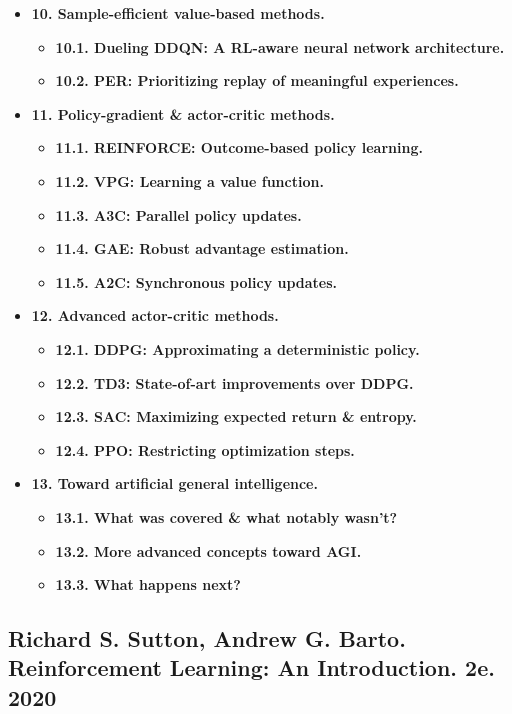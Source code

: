 \documentclass{article}
\begin{document}
\begin{itemize}
    \item {\bf10. Sample-efficient value-based methods.}
    \begin{itemize}
        \item {\bf10.1. Dueling DDQN: A RL-aware neural network architecture.}
        \item {\bf10.2. PER: Prioritizing replay of meaningful experiences.}
    \end{itemize}
    \item {\bf11. Policy-gradient \& actor-critic methods.}
    \begin{itemize}
        \item {\bf11.1. REINFORCE: Outcome-based policy learning.}
        \item {\bf11.2. VPG: Learning a value function.}
        \item {\bf11.3. A3C: Parallel policy updates.}
        \item {\bf11.4. GAE: Robust advantage estimation.}
        \item {\bf11.5. A2C: Synchronous policy updates.}
    \end{itemize}
    \item {\bf12. Advanced actor-critic methods.}
    \begin{itemize}
        \item {\bf12.1. DDPG: Approximating a deterministic policy.}
        \item {\bf12.2. TD3: State-of-art improvements over DDPG.}
        \item {\bf12.3. SAC: Maximizing expected return \& entropy.}
        \item {\bf12.4. PPO: Restricting optimization steps.}
    \end{itemize}
    \item {\bf13. Toward artificial general intelligence.}
    \begin{itemize}
        \item {\bf13.1. What was covered \& what notably wasn't?}
        \item {\bf13.2. More advanced concepts toward AGI.}
        \item {\bf13.3. What happens next?}
    \end{itemize}
\end{itemize}


\subsection{{\sc Richard S. Sutton, Andrew G. Barto}. Reinforcement Learning: An Introduction. 2e. 2020}
\end{document}
